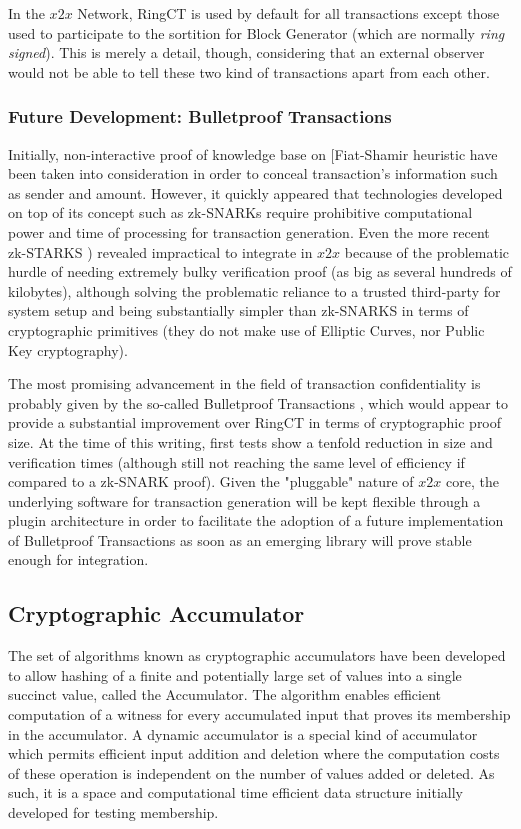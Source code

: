 In the $x2x$ Network, RingCT is used by default for all transactions except those used to participate to the sortition for Block Generator (which are normally \textit{ring signed}). This is merely a detail, though, considering that an external observer would not be able to tell these two kind of transactions apart from each other.

\subsubsection{Future Development: Bulletproof Transactions}

Initially, non-interactive proof of knowledge base on [Fiat-Shamir heuristic \cite{Shamir} have been taken into consideration in order to conceal transaction's information such as sender and amount. However, it quickly appeared that technologies developed on top of its concept such as zk-SNARKs \cite{zcash} require prohibitive computational power and time of processing for transaction generation. Even the more recent zk-STARKS \cite{starks}) revealed impractical to integrate in $x2x$ because of the problematic hurdle of needing extremely bulky verification proof (as big as several hundreds of kilobytes), although solving the problematic reliance to a trusted third-party for system setup and being substantially simpler than zk-SNARKS in terms of cryptographic primitives (they do not make use of Elliptic Curves, nor Public Key cryptography). 

The most promising advancement in the field of transaction confidentiality is probably given by the so-called Bulletproof Transactions \cite{bulletproofs}, which would appear to provide a substantial improvement over RingCT in terms of cryptographic proof size. At the time of this writing, first tests show a tenfold reduction in size and verification times (although still not reaching the same level of efficiency if compared to a zk-SNARK proof). Given the "pluggable" nature of $x2x$ core, the underlying software for transaction generation will be kept flexible through a plugin architecture in order to facilitate the adoption of a future implementation of Bulletproof Transactions as soon as an emerging library will prove stable enough for integration.

\subsection{Cryptographic Accumulator}
\label{sec:Cryptographic-Accumulator}
The set of algorithms known as cryptographic accumulators have been developed to allow hashing of a finite and potentially large set of values into a single succinct value, called the Accumulator. The algorithm enables efficient computation of a witness for every accumulated input that proves its membership in the accumulator. A dynamic accumulator is a special kind of accumulator which permits efficient input addition and deletion where the computation costs of these operation is independent on the number of values added or deleted. As such, it is a space and computational time efficient data structure initially developed for testing membership. 

